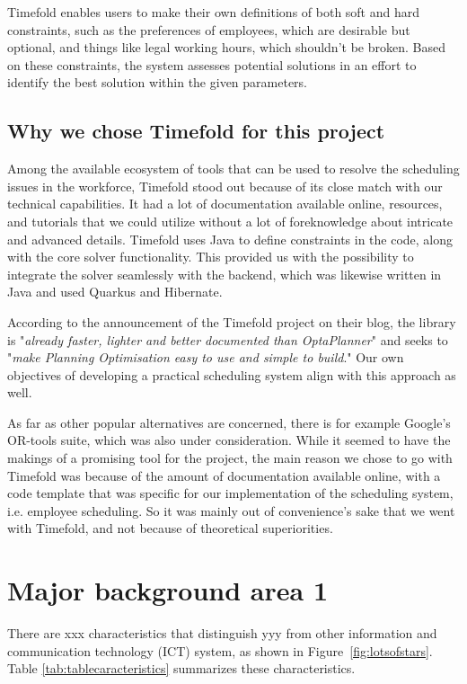 \documentclass[nomenclature, english, bibtex]{kththesis}
\newcommand*{\sweExpl}[1]{\todo[inline, backgroundcolor=kth-lightblue40]{#1}}  %
\begin{document}
Timefold enables users to make their own definitions of both soft and hard constraints, such as the preferences of employees, which are desirable but optional, and things like legal working hours, which shouldn't be broken.  Based on these constraints, the system assesses potential solutions in an effort to identify the best solution within the given parameters. \cite{timefold_documentation_timefold_platform} \cite{timefold_documentation_planning-ai-concepts}

\subsection{Why we chose Timefold for this project}
Among the available ecosystem of tools that can be used to resolve the scheduling issues in the workforce, Timefold stood out because of its close match with our technical capabilities. It had a lot of documentation available online, resources, and tutorials that we could utilize without a lot of foreknowledge about intricate and advanced details. Timefold uses Java to define constraints in the code, along with the core solver functionality. This provided us with the possibility to integrate the solver seamlessly with the backend, which was likewise written in Java and used Quarkus and Hibernate. 

According to the announcement of the Timefold project on their blog, the library is "\textit{already faster, lighter and better documented than OptaPlanner}" and seeks to "\textit{make Planning Optimisation easy to use and simple to build}." \cite{timefold_optaplanner} Our own objectives of developing a practical scheduling system align with this approach as well. 

As far as other popular alternatives are concerned, there is for example Google's OR-tools suite, which was also under consideration. While it seemed to have the makings of a promising tool for the project, the main reason we chose to go with Timefold was because of the amount of documentation available online, with a code template that was specific for our implementation of the scheduling system, i.e. employee scheduling. So it was mainly out of convenience's sake that we went with Timefold, and not because of theoretical superiorities.

\section{Major background area 1}
\sweExpl{Viktigt bakgrundsområde 1}
There are xxx characteristics that distinguish yyy from other information and communication technology (ICT) system, as shown in Figure~\ref{fig:lotsofstars}. Table \ref{tab:tablecaracteristics} summarizes these characteristics.
\end{document}
